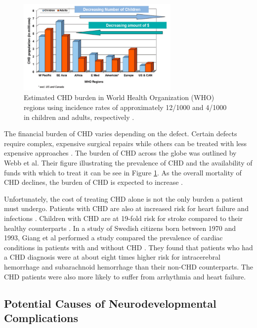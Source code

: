 \begin{figure}
\centering
\includegraphics[width=0.7\textwidth]{5/CHD-burden-webb.png}
\caption{Estimated CHD burden in World Health Organization (WHO) regions using incidence rates of approximately 12/1000 and 4/1000 in children and adults, respectively \cite{Webb2015}.}
\label{ch5:fig:CHD-burden}

\end{figure}

The financial burden of CHD varies depending on the defect. Certain defects require complex, expensive surgical repairs while others can be treated with less expensive approaches \cite{Mozaffarian2016}. The burden of CHD across the globe was outlined by Webb et al. Their figure illustrating the prevalence of CHD and the availability of funds with which to treat it can be see in Figure \ref{ch5:fig:CHD-burden}. As the overall mortality of CHD declines, the burden of CHD is expected to increase \cite{Mozaffarian2016}.

Unfortunately, the cost of treating CHD alone is not the only burden a patient must undergo. Patients with CHD are also at increased risk for heart failure and infections \cite{Mozaffarian2016}. Children with CHD are at 19-fold risk for stroke compared to their healthy counterparts \cite{Fox2015}. In a study of Swedish citizens born between 1970 and 1993, Giang et al performed a study compared the prevalence of cardiac conditions in patients with and without CHD \cite{Giang2018}. They found that patients who had a CHD diagnosis were at about eight times higher risk for intracerebral hemorrhage and subarachnoid hemorrhage than their non-CHD counterparts. The CHD patients were also more likely to suffer from arrhythmia and heart failure.



\subsection{Potential Causes of Neurodevelopmental Complications}

